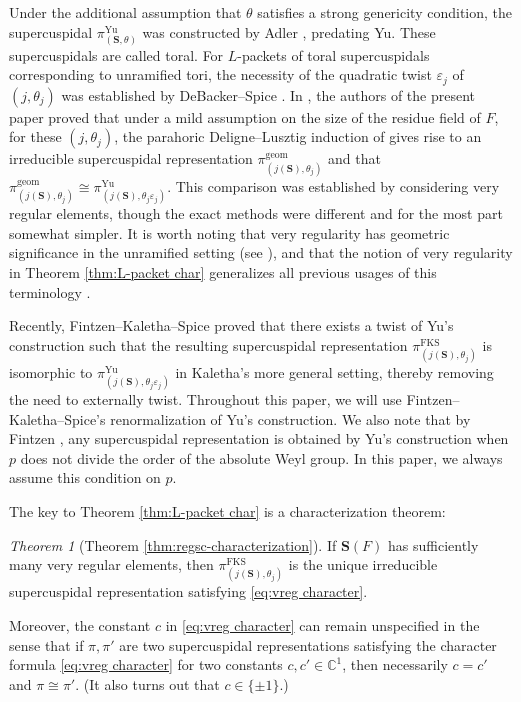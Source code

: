 \documentclass{amsart}
\newcommand{\geom}{\mathrm{geom}}
\newcommand{\FKS}{\mathrm{FKS}}
\newcommand{\Yu}{\mathrm{Yu}}
\newcommand{\C}{\mathbb{C}}
\newcommand{\bfS}{\mathbf{S}}
\theoremstyle{plain}
\theoremstyle{definition}
\theoremstyle{remark}
\theoremstyle{theorem}
\newtheorem{displaytheoremprime}{Theorem}
\begin{document}
Under the additional assumption that $\theta$ satisfies a strong genericity condition, the supercuspidal $\pi^{\Yu}_{(\bfS,\theta)}$ was constructed by Adler \cite{Adl98}, predating Yu.
These supercuspidals are called toral.
For $L$-packets of toral supercuspidals corresponding to unramified tori, the necessity of the quadratic twist $\varepsilon_j$ of $(j,\theta_j)$ was established by DeBacker--Spice \cite{DS18}.
In \cite{CO21}, the authors of the present paper proved that under a mild assumption on the size of the residue field of $F$, for these $(j,\theta_j)$, the parahoric Deligne--Lusztig induction of \cite{CI21-RT} gives rise to an irreducible supercuspidal representation $\pi_{(j(\bfS),\theta_j)}^{\geom}$ and that $\pi_{(j(\bfS),\theta_j)}^{\geom} \cong \pi^{\Yu}_{(j(\bfS),\theta_j \varepsilon_j)}$. 
This comparison was established by considering very regular elements, though the exact methods were different and for the most part somewhat simpler. 
It is worth noting that very regularity has geometric significance in the unramified setting (see \cite[Theorem 1.2]{CI21-RT}), and that the notion of very regularity in Theorem \ref{thm:L-packet char} generalizes all previous usages of this terminology \cite{Hen92,Hen93,CI21-RT,CO21}.

Recently, Fintzen--Kaletha--Spice \cite{FKS21} proved that there exists a twist of Yu's construction such that the resulting supercuspidal representation $\pi_{(j(\bfS),\theta_j)}^{\FKS}$ is isomorphic to $\pi^{\Yu}_{(j(\bfS),\theta_j \varepsilon_j)}$ in Kaletha's more general setting, thereby removing the need to externally twist. Throughout this paper, we will use Fintzen--Kaletha--Spice's renormalization of Yu's construction.
We also note that by Fintzen \cite{Fin21-Ann}, any supercuspidal representation is obtained by Yu's construction when $p$ does not divide the order of the absolute Weyl group.
In this paper, we always assume this condition on $p$.

The key to Theorem \ref{thm:L-packet char} is a characterization theorem: 

\begin{displaytheoremprime}[Theorem \ref{thm:regsc-characterization}]\label{thm:intro regsc char}
    If $\bfS(F)$ has sufficiently many very regular elements, then $\pi_{(j(\bfS),\theta_j)}^{\FKS}$ is the unique irreducible supercuspidal representation satisfying \eqref{eq:vreg character}.
\end{displaytheoremprime}

Moreover, the constant $c$ in \eqref{eq:vreg character} can remain unspecified in the sense that if $\pi,\pi'$ are two supercuspidal representations satisfying the character formula \eqref{eq:vreg character} for two constants $c,c'\in\C^{1}$, then necessarily $c = c'$ and $\pi \cong \pi'$. (It also turns out that $c \in \{\pm 1\}$.) 
\end{document}
